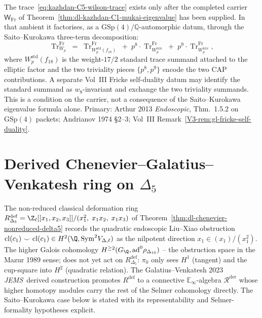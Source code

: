 \begin{remark}
\label{rem:dl-kazhdan-wilson-factorisation}
The trace~\eqref{eq:kazhdan-C5-wilson-trace} exists only after the
completed carrier \(\mathsf W_{\mathrm{Fr}}\) of
Theorem~\ref{thm:dl-kazhdan-C1-mukai-eigenvalue} has been supplied.
In that ambient it factorises, as a
$\mathrm{GSp}(4)/\mathbb{Q}$-automorphic datum, through the
Saito--Kurokawa three-term decomposition:
\[
 \operatorname{Tr}^{\mathrm{Fr}}_{W_p}
 \;=\;
 \operatorname{Tr}^{\mathrm{Fr}}_{W_p^{\mathrm{std}}(f_{18})}
 \;+\;
 p^8 \cdot \operatorname{Tr}^{\mathrm{Fr}}_{W_p^{\mathrm{triv}}}
 \;+\;
 p^9 \cdot \operatorname{Tr}^{\mathrm{Fr}}_{W_p^{\mathrm{triv}}},
\]
where $W_p^{\mathrm{std}}(f_{18})$ is the weight-$17/2$ standard
trace summand attached to the elliptic factor and the two triviality
pieces $\{p^8, p^9\}$ encode the two CAP contributions. A separate
Vol~III Fricke self-duality datum may identify the standard summand as
$w_8$-invariant and exchange the two triviality summands. This is a
condition on the carrier, not a consequence of the Saito--Kurokawa
eigenvalue formula alone. Primary:
Arthur 2013 \emph{Endoscopic}, Thm.~1.5.2 on $\mathrm{GSp}(4)$ packets;
Andrianov 1974 \S 2--3; Vol~III
Remark~\ref{V3-rem:gl-fricke-self-duality}.
\end{remark}

\section{Derived Chenevier--Galatius--Venkatesh ring on $\Delta_5$}
\label{sec:dl-derived-chenevier-gv-delta5}

The non-reduced classical deformation ring
$R^{\mathrm{def}}_{\Delta_5}
 = \Z_\ell[[x_1,x_2,x_3]]/(x_1^2,\;x_1 x_2,\;x_1 x_3)$
of Theorem~\ref{thm:dl-chenevier-nonreduced-delta5} records the quadratic
endoscopic Liu--Xiao obstruction $\mathrm{cl}(c_1)\smile\mathrm{cl}(c_1)\in
H^2(\Q,\mathrm{Sym}^2 V_{\Delta,\ell})$ as the nilpotent direction
$x_1\in(x_1)/(x_1^2)$. The higher Galois cohomology
$H^{\ge 2}(G_\Q,\mathrm{ad}^0\rho_{\Delta_{10}})$
-- the obstruction space in the Mazur 1989 sense; does not yet act on
$R^{\mathrm{def}}_{\Delta_5}$: $\pi_0$ only sees $H^1$ (tangent) and the
cup-square into $H^2$ (quadratic relation). The Galatius--Venkatesh
2023 \emph{JEMS}\ derived construction promotes $R^{\mathrm{def}}$ to a
connective $\mathbb E_\infty$-algebra $\mathcal R^{\mathrm{der}}$ whose
higher homotopy modules carry the rest of the Selmer cohomology
directly. The Saito--Kurokawa case below is stated with its
representability and Selmer-formality hypotheses explicit.

